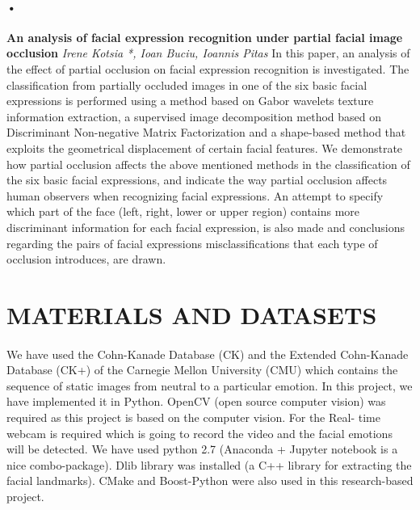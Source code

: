 \documentclass[a4paper,12pt,oneside]{article}
\begin{document}
\paragraph{•}
\textbf{An analysis of facial expression recognition under partial
facial image occlusion}
\textit{Irene Kotsia *, Ioan Buciu, Ioannis Pitas }
In this paper, an analysis of the effect of partial occlusion on facial expression recognition is investigated. The classification from partially
occluded images in one of the six basic facial expressions is performed using a method based on Gabor wavelets texture information
extraction, a supervised image decomposition method based on Discriminant Non-negative Matrix Factorization and a shape-based
method that exploits the geometrical displacement of certain facial features. We demonstrate how partial occlusion affects the above
mentioned methods in the classification of the six basic facial expressions, and indicate the way partial occlusion affects human observers
when recognizing facial expressions. An attempt to specify which part of the face (left, right, lower or upper region) contains more discriminant
information for each facial expression, is also made and conclusions regarding the pairs of facial expressions misclassifications
that each type of occlusion introduces, are drawn.
\newpage
\section{MATERIALS AND DATASETS}
\paragraph{}
We have used the Cohn-Kanade Database (CK) and the
Extended Cohn-Kanade Database (CK+) of the Carnegie
Mellon University (CMU) which contains the sequence
of static images from neutral to a particular emotion. In
this project, we have implemented it in Python. OpenCV
(open source computer vision) was required as this
project is based on the computer vision. For the Real-
time webcam is required which is going to record the
video and the facial emotions will be detected. We have
used python 2.7 (Anaconda + Jupyter notebook is a nice
combo-package). Dlib library was installed (a C++
library for extracting the facial landmarks). CMake and
Boost-Python were also used in this research-based
project.
\paragraph{}
\end{document}
